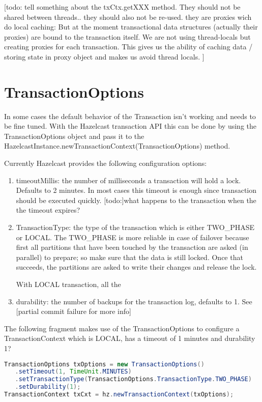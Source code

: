 [todo: tell something about the txCtx.getXXX method. They should not be shared between threads.. they should also not be re-used. they are proxies wich do local caching: But at the moment transactional data structures (actually their proxies) are bound to the transaction itself. We are not using thread-locals but creating proxies for each transaction. This gives us the ability of caching data / storing state in proxy object and makes us avoid thread locals. ]

\section{TransactionOptions}
In some cases the default behavior of the Transaction isn't working and needs to be fine tuned. With the Hazelcast transaction API this can be done by using the TransactionOptions object and pass it to the HazelcastInstance.newTransactionContext(TransactionOptions) method.

Currently Hazelcast provides the following configuration options:
\begin{enumerate}
\item timeoutMillis: the number of milliseconds a transaction will hold a lock. Defaults to 2 minutes. In most cases this timeout is enough since transaction should be executed quickly. [todo:]what happens to the transaction when the the timeout expires?
\item TransactionType: the type of the transaction which is either TWO_PHASE or LOCAL. The TWO_PHASE is more reliable in case of failover because first all partitions that have been touched by the transaction are asked (in parallel) to prepare; so make sure that the data is still locked. Once that succeeds, the partitions are asked to write their changes and release the lock. 

With LOCAL transaction, all the 
\item durability: the number of backups for the transaction log, defaults to 1. See [partial commit failure for more info]
\end{enumerate}

The following fragment makes use of the TransactionOptions to configure a TransactionContext which is LOCAL, has a timeout of 1 minutes and durability 1?
\begin{lstlisting}[language=java]
TransactionOptions txOptions = new TransactionOptions()
   .setTimeout(1, TimeUnit.MINUTES)
   .setTransactionType(TransactionOptions.TransactionType.TWO_PHASE)
   .setDurability(1);
TransactionContext txCxt = hz.newTransactionContext(txOptions);
\end{lstlisting}

